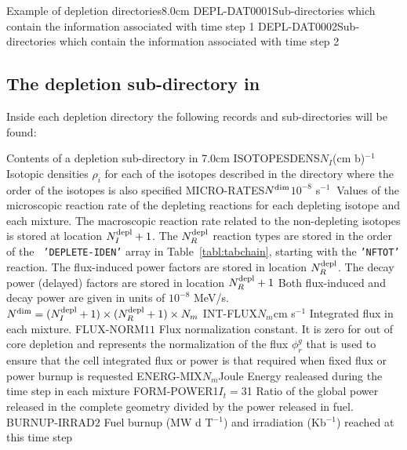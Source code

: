 \begin{DescriptionEnregistrement}{Example of depletion directories}{8.0cm}
\DirEnr
  {DEPL-DAT0001}{Sub-directories which contain the information associated with
   time step 1}
\DirEnr
  {DEPL-DAT0002}{Sub-directories which contain the information associated with
   time step 2}
\end{DescriptionEnregistrement}

\clearpage

\subsection{The depletion sub-directory  in
}\label{sect:burnupdirdepletion}

Inside each depletion directory the following records and sub-directories will be found:

\begin{DescriptionEnregistrement}{Contents of a depletion sub-directory in }{7.0cm}
\RealEnr
  {ISOTOPESDENS}{$N_{I}$}{(cm b)$^{-1}$}
  {Isotopic densities $\rho_{i}$ for each of the isotopes described in the  directory
   where the order of the isotopes is also specified}
\RealEnr
  {MICRO-RATES}{$N^{\rm dim}$}{$10^{-8}$ s$^{-1}\ $}
  {Values of the microscopic reaction rate of the depleting reactions for each
   depleting isotope and each mixture. The macroscopic reaction rate related to the
   non-depleting isotopes is stored at location $N^{\rm depl}_{I}+1$. The
   $N^{\rm depl}_{R}$ reaction types are stored in the order of the {\tt
   'DEPLETE-IDEN'} array in Table~\ref{tabl:tabchain}, starting with the {\tt 'NFTOT'}
   reaction. The flux-induced power factors are stored in location $N^{\rm depl}_{R}$.
   The decay power (delayed) factors are stored in location $N^{\rm depl}_{R}+1$ Both
   flux-induced and decay power are given in units of $10^{-8}$ MeV/s.
   $N^{\rm dim}=(N^{\rm depl}_{I}+1)
   \times (N^{\rm depl}_{R}+1) \times N_m$}
\RealEnr
  {INT-FLUX}{$N_m$}{cm s$^{-1}$}
  {Integrated flux in each mixture.}
\RealEnr
  {FLUX-NORM}{$1$}{$1$}
  {Flux normalization constant. It is zero for out of core depletion and
   represents the
   normalization of the flux $\phi_{r}^{g}$ that is used to ensure that the cell integrated flux or
   power is that required when fixed flux or power burnup is requested}
\RealEnr
  {ENERG-MIX}{$N_m$}{Joule}
  {Energy realeased during the time step in each mixture}
\OptRealEnr
  {FORM-POWER}{1}{$I_{t}=3$}{1}
  {Ratio of the global power released in the complete geometry divided by the
   power released in fuel.}
\RealEnr
  {BURNUP-IRRAD}{$2$}{}
  {Fuel burnup (MW d T$^{-1}$) and irradiation (Kb$^{-1}$) reached at this time step}
\end{DescriptionEnregistrement}

\eject
